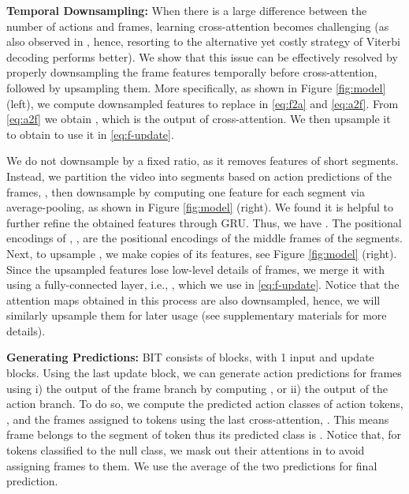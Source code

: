 \documentclass[10pt,twocolumn,letterpaper]{article}
\newcommand{\headline}[1]{\noindent \textbf{#1}}
\newcommand{\0}{\boldsymbol{0}}
\begin{document}
\headline{Temporal Downsampling: } 
When there is a large difference between the number of actions and frames, learning cross-attention becomes challenging (as also observed in \cite{Behrmann:ECCV22}, hence, resorting to the alternative yet costly strategy of Viterbi decoding performs better). 
We show that this issue can be effectively resolved by properly downsampling the frame features temporally before cross-attention, followed by upsampling them. More specifically, as shown in Figure \ref{fig:model} (left), we compute downsampled features  to replace  in \eqref{eq:f2a} and \eqref{eq:a2f}.  
From \eqref{eq:a2f} we obtain , which is the output of cross-attention. We then upsample it to obtain  to use it in \eqref{eq:f-update}.

We do not downsample  by a fixed ratio, as it removes features of short segments.
Instead, we partition the video into segments based on action predictions of the frames, , then downsample  by computing one feature for each segment via average-pooling, as shown in Figure \ref{fig:model} (right).
We found it is helpful to further refine the obtained features through GRU. 
Thus, we have . The positional encodings of , , are the positional encodings of the middle frames of the segments.
Next, to upsample , we make copies of its features, see Figure \ref{fig:model} (right). Since the upsampled features lose low-level details of frames, we merge it with  using a fully-connected layer, i.e., , which we use in \eqref{eq:f-update}. 
Notice that the attention maps obtained in this process are also downsampled, hence, we will similarly upsample them for later usage (see supplementary materials for more details). 





\headline{Generating Predictions: }
BIT consists of  blocks, with 1 input and  update blocks. Using the last update block, we can generate action predictions for frames using i) the output of the frame branch by computing , or ii) the output of the action branch. 
To do so, we compute the predicted action classes of action tokens, , and the frames assigned to tokens  using the last cross-attention, . This means frame  belongs to the segment of token  thus its predicted class is .
Notice that, for tokens classified to the null class, we mask out their attentions in  to avoid assigning frames to them. 
We use the average of the two predictions for final prediction.
\end{document}
